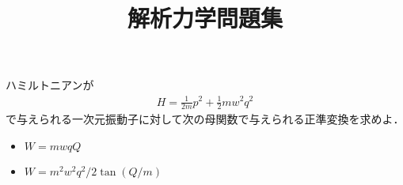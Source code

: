 \documentclass[a4j]{jarticle}
\title{解析力学問題集}
\begin{document}
 ハミルトニアンが
 \begin{align}
  H=\frac{1}{2m}p^2+\frac{1}{2}mw^2q^2
 \end{align}
 で与えられる一次元振動子に対して次の母関数で与えられる正準変換を求めよ．
 \begin{itemize}
  \item $W=mwqQ$
  \item $W=m^2w^2q^2/2\tan(Q/m)$
 \end{itemize}

 
 
\end{document}
